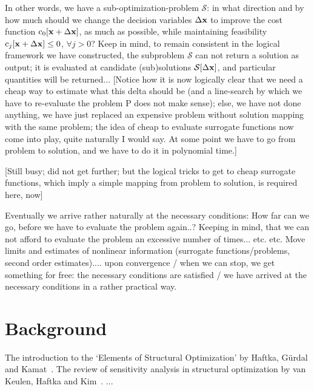 \documentclass[11pt]{article}
\begin{document}
In other words, we have a sub-optimization-problem $\mathcal{S}$: in what direction and by how much should we change the decision variables $\Delta \mathbf{x}$ to improve the cost function $\textrm{c}_0[\mathbf{x} + \Delta \mathbf{x}]$, as much as possible, while maintaining feasibility $\textrm{c}_j[\mathbf{x} + \Delta \mathbf{x}] \leq 0$, $\forall j > 0 $? Keep in mind, to remain consistent in the logical framework we have constructed, the subproblem $\mathcal{S}$ can not return a solution as output; it is evaluated at candidate (sub)solutions $\mathcal{S}[\Delta \mathbf{x}]$, and particular quantities will be returned... [Notice how it is now logically clear that we need a cheap way to estimate what this delta should be (and a line-search by which we have to re-evaluate the problem P does not make sense); else, we have not done anything, we have just replaced an expensive problem without solution mapping with the same problem; the idea of cheap to evaluate surrogate functions now come into play, quite naturally I would say. At some point we have to go from problem to solution, and we have to do it in polynomial time.]

[Still busy; did not get further; but the logical tricks to get to cheap surrogate functions, which imply a simple mapping from problem to solution, is required here, now]

Eventually we arrive rather naturally at the necessary conditions: How far can we go, before we have to evaluate the problem again..? Keeping in mind, that we can not afford to evaluate the problem an excessive number of times... etc. etc. Move limits and estimates of nonlinear information (surrogate functions/problems, second order estimates).... upon convergence / when we can stop, we get something for free: the necessary conditions are satisfied / we have arrived at the necessary conditions in a rather practical way.



\section*{Background}

The introduction to the `Elements of Structural Optimization' by Haftka, G\"urdal and Kamat~\cite{haftka1990}. The review of sensitivity analysis in structural optimization by van Keulen, Haftka and Kim~\cite{keulen2005}. ... 

 
 
\end{document}
